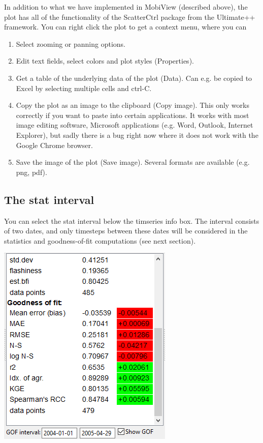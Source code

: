 \documentclass[11pt]{article}
\theoremstyle{definition}
\begin{document}
In addition to what we have implemented in MobiView (described above), the plot has all of the functionality of the ScatterCtrl package from the Ultimate++ framework. You can right click the plot to get a context menu, where you can
\begin{enumerate}[i]
\item Select zooming or panning options.
\item Edit text fields, select colors and plot styles (Properties).
\item Get a table of the underlying data of the plot (Data). Can e.g. be copied to Excel by selecting multiple cells and ctrl-C.
\item Copy the plot as an image to the clipboard (Copy image). This only works correctly if you want to paste into certain applications. It works with most image editing software, Microsoft applications (e.g. Word, Outlook, Internet Explorer), but sadly there is a bug right now where it does not work with the Google Chrome browser.
\item Save the image of the plot (Save image). Several formats are available (e.g. png, pdf).
\end{enumerate}

\subsection{The stat interval}\label{sec:gofint}

You can select the stat interval below the timseries info box. The interval consists of two dates, and only timesteps between these dates will be considered in the statistics and goodness-of-fit computations (see next section).

\begin{center}
\includegraphics[width=0.3\linewidth]{img/gof}
\end{center}
\end{document}
